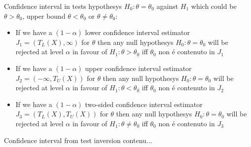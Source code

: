 \documentclass[asd-beamer.tex]{subfiles}
\begin{document}
\begin{frame}{Confidence interval in tests hypothesys}
$H_0: \theta=\theta_0$ against $H_1$ which could be $\theta>\theta_0$, upper bound $\theta<\theta_0$ or $\theta\neq\theta_0$:
\begin{itemize}
    \item If we have a $(1-\alpha)$ lower confidence interval estimator $J_1=(T_L(X),\infty)$ for $\theta$ then any null hypothesys $H_0: \theta=\theta_0$ will be rejected at level $\alpha$ in favour of $H_1:\theta>\theta_0$ iff $\theta_0$ non \'e contenuto in $J_1$
\item If we have a $(1-\alpha)$ upper confidence interval estimator $J_2=(-\infty,T_U(X))$ for $\theta$ then any null hypothesys $H_0: \theta=\theta_0$ will be rejected at level $\alpha$ in favour of $H_1: \theta<\theta_0$ iff $\theta_0$ non \'e contenuto in $J_2$
\item If we have a $(1-\alpha)$ two-sided confidence interval estimator $J_3=(T_L(X),T_U(X))$ for $\theta$ then any null hypothesys $H_0: \theta=\theta_0$ will be rejected at level $\alpha$ in favour of $H_1: \theta\neq\theta_0$ iff $\theta_0$ non \'e contenuto in $J_3$
\end{itemize}
\end{frame}

\begin{frame}{Confidence interval from test inversion}
	contenu...
\end{frame}
\end{document}
